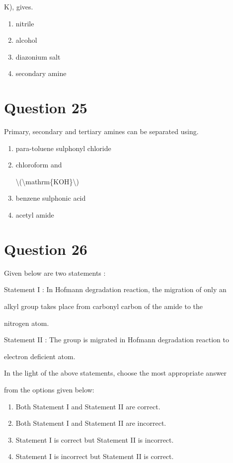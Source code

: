 \documentclass{article}
\begin{document}
K), gives.


\begin{enumerate}[label=(\alph*)]
\item nitrile


\item alcohol


\item diazonium salt


\item secondary amine


\end{enumerate}
\newpage
\section*{Question 25}
Primary, secondary and tertiary amines can be separated using.


\begin{enumerate}[label=(\alph*)]
\item para-toluene sulphonyl chloride


\item chloroform and

\textbackslash(\textbackslash mathrm\{KOH\}\textbackslash)


\item benzene sulphonic acid


\item acetyl amide


\end{enumerate}
\newpage
\section*{Question 26}
Given below are two statements :



Statement I : In Hofmann degradation reaction, the migration of only an

alkyl group takes place from carbonyl carbon of the amide to the

nitrogen atom.



Statement II : The group is migrated in Hofmann degradation reaction to

electron deficient atom.



In the light of the above statements, choose the most appropriate answer

from the options given below:


\begin{enumerate}[label=(\alph*)]
\item Both Statement I and Statement II are correct.


\item Both Statement I and Statement II are incorrect.


\item Statement I is correct but Statement II is incorrect.


\item Statement I is incorrect but Statement II is correct.


\end{enumerate}
\newpage
\end{document}
